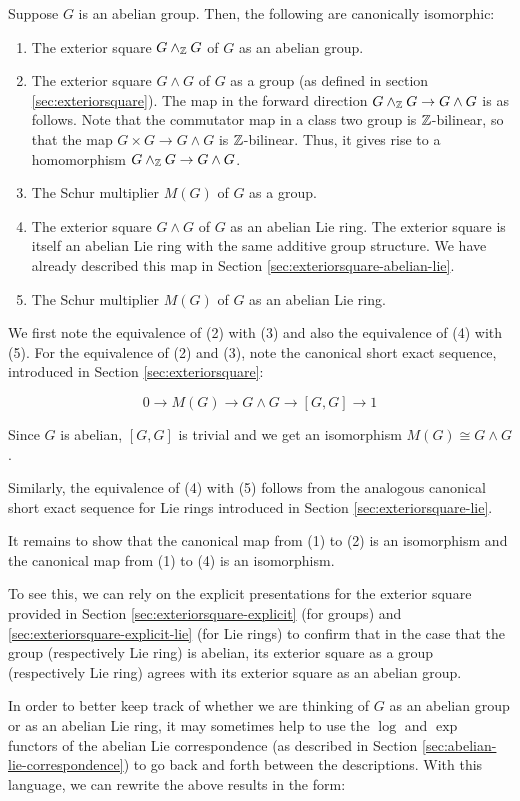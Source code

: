 Suppose $G$ is an abelian group. Then, the following are canonically
isomorphic:

\begin{enumerate}
\item The exterior square $G \wedge_{\mathbb{Z}} G$ of $G$ as an abelian group.
\item The exterior square $G \wedge G$ of $G$ as a group (as defined
  in section \ref{sec:exteriorsquare}). The map in the forward
  direction $G \wedge_{\mathbb{Z}} G \to G \wedge G$ is as follows. Note that
  the commutator map in a class two group is $\mathbb{Z}$-bilinear, so that
  the map $G \times G \to G \wedge G$ is $\mathbb{Z}$-bilinear. Thus, it gives
  rise to a homomorphism $G \wedge_{\mathbb{Z}} G \to G \wedge G$.
\item The Schur multiplier $M(G)$ of $G$ as a group.
\item The exterior square $G \wedge G$ of $G$ as an abelian Lie
  ring. The exterior square is itself an abelian Lie ring with the
  same additive group structure. We have already described this map in
  Section \ref{sec:exteriorsquare-abelian-lie}.
\item The Schur multiplier $M(G)$ of $G$ as an abelian Lie ring.
\end{enumerate}

We first note the equivalence of (2) with (3) and also the equivalence
of (4) with (5). For the equivalence of (2) and (3), note the
canonical short exact sequence, introduced in Section
\ref{sec:exteriorsquare}:

$$0 \to M(G) \to G \wedge G \to [G,G] \to 1$$

Since $G$ is abelian, $[G,G]$ is trivial and we get an isomorphism
$M(G) \cong G \wedge G$.

Similarly, the equivalence of (4) with (5) follows from the analogous
canonical short exact sequence for Lie rings introduced in Section
\ref{sec:exteriorsquare-lie}.

It remains to show that the canonical map from (1) to (2) is an
isomorphism and the canonical map from (1) to (4) is an isomorphism.

To see this, we can rely on the explicit presentations for the
exterior square provided in Section \ref{sec:exteriorsquare-explicit}
(for groups) and \ref{sec:exteriorsquare-explicit-lie} (for Lie rings)
to confirm that in the case that the group (respectively Lie ring) is
abelian, its exterior square as a group (respectively Lie ring) agrees
with its exterior square as an abelian group.

In order to better keep track of whether we are thinking of $G$ as an
abelian group or as an abelian Lie ring, it may sometimes help to use
the $\log$ and $\exp$ functors of the abelian Lie correspondence (as
described in Section \ref{sec:abelian-lie-correspondence}) to go back
and forth between the descriptions. With this language, we can rewrite
the above results in the form:


